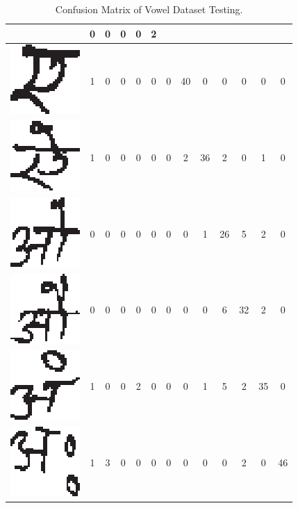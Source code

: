\begin{table}[h]
\begin{tabular}{|c|c|c|c|c|c|c|c|c|c|c|c|c|}
 & 0 & 0 & 0 & 0 & 2\tabularnewline
\hline
\includegraphics[scale=0.25]{figures/datasets/nhcr/vowels/7ye} & 1 & 0 & 0 & 0 & 0 & 0 & 40 & 0 & 0 & 0 & 0 & 0\tabularnewline
\hline
\includegraphics[scale=0.25]{figures/datasets/nhcr/vowels/8ai} & 1 & 0 & 0 & 0 & 0 & 0 & 2 & 36 & 2 & 0 & 1 & 0\tabularnewline
\hline
\includegraphics[scale=0.25]{figures/datasets/nhcr/vowels/9o} & 0 & 0 & 0 & 0 & 0 & 0 & 0 & 1 & 26 & 5 & 2 & 0\tabularnewline
\hline
\includegraphics[scale=0.25]{figures/datasets/nhcr/vowels/10au} & 0 & 0 & 0 & 0 & 0 & 0 & 0 & 0 & 6 & 32 & 2 & 0\tabularnewline
\hline
\includegraphics[scale=0.25]{figures/datasets/nhcr/vowels/11an} & 1 & 0 & 0 & 2 & 0 & 0 & 0 & 1 & 5 & 2 & 35 & 0\tabularnewline
\hline
\includegraphics[scale=0.25]{figures/datasets/nhcr/vowels/12ah} & 1 & 3 & 0 & 0 & 0 & 0 & 0 & 0 & 0 & 2 & 0 & 46 \tabularnewline
\hline
\end{tabular}
\caption{Confusion Matrix of Vowel Dataset Testing.}
\label{table_vowel_cm}
\end{table}

